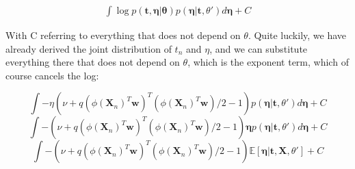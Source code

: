 \documentclass[a4paper,12pt]{article}
\begin{document}
\begin{align*}
\int \log p(\bm{t}, \bm{\eta | \theta}) p(\bm{\eta} | \bm{t}, \theta')d\bm{\eta} + C
\end{align*}

With C referring to everything that does not depend on $\theta$. Quite luckily, we have already derived the joint distribution of $t_n$ and $\eta$, and we can substitute everything there that does not depend on $\theta$, which is the exponent term, which of course cancels the log:


$$
\int -\eta(\nu + q (\phi(\bm{X}_n)^{T}\bm{w})^T(\phi(\bm{X}_n)^T\bm{w})/2 - 1) p(\bm{\eta} | \bm{t}, \theta')d\bm{\eta} + C
$$
$$
\int -(\nu + q (\phi(\bm{X}_n)^{T}\bm{w})^T(\phi(\bm{X}_n)^T\bm{w})/2 - 1) \bm{\eta} p(\bm{\eta} | \bm{t}, \theta')d\bm{\eta} + C
$$
$$
\int -(\nu + q (\phi(\bm{X}_n)^{T}\bm{w})^T(\phi(\bm{X}_n)^T\bm{w})/2 - 1) \mathbb{E}[\bm{\eta} | \bm{t}, \bm{X}, \theta'] + C
$$
\end{document}
